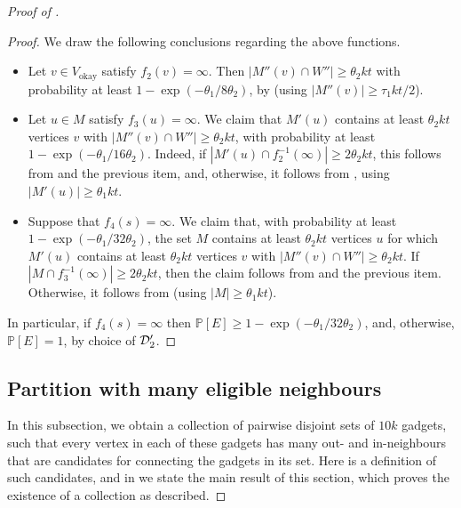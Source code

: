 \documentclass[english]{article}
\theoremstyle{plain}
\theoremstyle{remark}
\def \Vo {V_{\okay}}
\renewcommand{\Pr}{\mathbb{P}}
\DeclareMathOperator{\okay}{okay}
\begin{document}
\begin{proof}[Proof of ]
\begin{proof}
				We draw the following conclusions regarding the above functions.

				\begin{itemize}
					\item
						Let $v \in \Vo$ satisfy $f_2(v) = \infty$.
						Then $|M''(v) \cap W''| \ge \theta_2 kt$ with probability at least $1 - \exp(-\theta_1 / 8\theta_2)$, by  (using $|M''(v)| \ge \tau_1 kt / 2$).
					\item
						Let $u \in M$ satisfy $f_3(u) = \infty$. 
						We claim that $M'(u)$ contains at least $\theta_2 kt$ vertices $v$ with $|M''(v) \cap W''| \ge \theta_2 kt$, with probability at least $1 - \exp(-\theta_1/16\theta_2)$.
						Indeed, if $|M'(u) \cap f_2^{-1}(\infty)| \ge 2\theta_2 kt$, this follows from  and the previous item, and, otherwise, it follows from , using $|M'(u)| \ge \theta_1 kt$.
					\item
						Suppose that $f_4(s) = \infty$.
						We claim that, with probability at least $1 - \exp(-\theta_1/32\theta_2)$, the set $M$ contains at least $\theta_2 kt$ vertices $u$ for which $M'(u)$ contains at least $\theta_2 kt$ vertices $v$ with $|M''(v) \cap W''| \ge \theta_2 kt$.
						If $|M \cap f_3^{-1}(\infty)| \ge 2\theta_2 kt$, then the claim follows from  and the previous item. Otherwise, it follows from  (using $|M| \ge \theta_1 kt$).
				\end{itemize}
				In particular, if $f_4(s) = \infty$ then $\Pr[E] \ge 1 - \exp(-\theta_1/32\theta_2)$, and, otherwise, $\Pr[E] = 1$, by choice of $\mathcal{D}_2'$. 
			\end{proof}

	\subsection{Partition with many eligible neighbours} \label{subsec:eligible}

		In this subsection, we obtain a collection of pairwise disjoint sets of $10k$ gadgets, such that every vertex in each of these gadgets has many out- and in-neighbours that are candidates for connecting the gadgets in its set. Here is a definition of such candidates, and in  we state the main result of this section, which proves the existence of a collection as described.


\end{proof}
\end{document}
